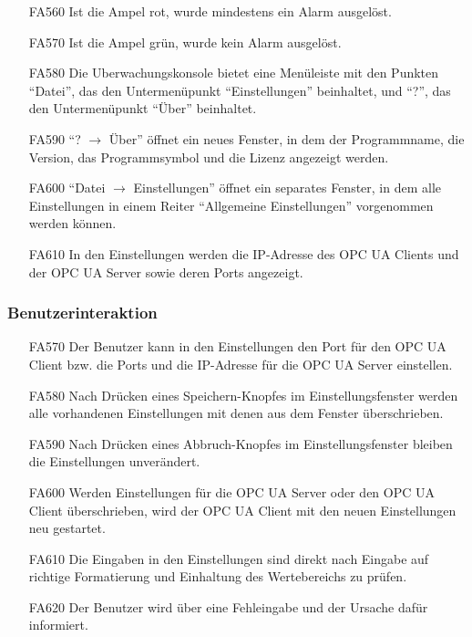 \documentclass[parskip=full]{scrartcl}
\begin{document}
\begin{enumerate}
\item[FA560] Ist die Ampel rot, wurde mindestens ein Alarm ausgelöst.
\item[FA570] Ist die Ampel grün, wurde kein Alarm ausgelöst.
\item[FA580] Die \gls{Uberwachungskonsole} bietet eine Menüleiste mit den Punkten "`Datei"', das den Untermenüpunkt "`Einstellungen"' beinhaltet, und "`?"', das den Untermenüpunkt "`Über"' beinhaltet.
\item[FA590] "`? $\rightarrow$ Über"' öffnet ein neues Fenster, in dem der Programmname, die Version, das Programmsymbol und die Lizenz angezeigt werden.
\item[FA600] "`Datei $\rightarrow$ Einstellungen"' öffnet ein separates Fenster, in dem alle Einstellungen in einem Reiter "`Allgemeine Einstellungen"' vorgenommen werden können.
\item[FA610] In den Einstellungen werden die IP-Adresse des OPC UA Clients und der OPC UA Server sowie deren Ports angezeigt.
\end{enumerate}

\subsubsection{Benutzerinteraktion}
\begin{enumerate}
\item[FA570] Der Benutzer kann in den Einstellungen den Port für den OPC UA Client bzw. die Ports und die IP-Adresse für die OPC UA Server einstellen.
\item[FA580] Nach Drücken eines Speichern-Knopfes im Einstellungsfenster werden alle vorhandenen Einstellungen mit denen aus dem Fenster überschrieben.
\item[FA590] Nach Drücken eines Abbruch-Knopfes im Einstellungsfenster bleiben die Einstellungen unverändert.
\item[FA600] Werden Einstellungen für die OPC UA Server oder den OPC UA Client überschrieben, wird der OPC UA Client mit den neuen Einstellungen neu gestartet.
\item[FA610] Die Eingaben in den Einstellungen sind direkt nach Eingabe auf richtige Formatierung und Einhaltung des Wertebereichs zu prüfen.
\item[FA620] Der Benutzer wird über eine Fehleingabe und der Ursache dafür informiert.
\end{enumerate}
\end{document}
